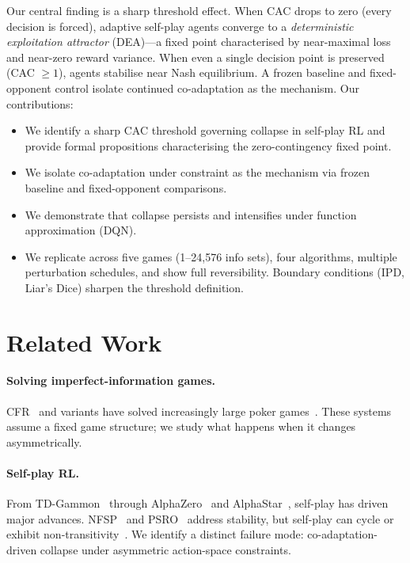 \documentclass[sigconf,anonymous]{acmart}
\begin{document}
Our central finding is a sharp threshold effect. When CAC drops to zero (every decision is forced), adaptive self-play agents converge to a \emph{deterministic exploitation attractor} (DEA)---a fixed point characterised by near-maximal loss and near-zero reward variance. When even a single decision point is preserved (CAC $\geq 1$), agents stabilise near Nash equilibrium. A frozen baseline and fixed-opponent control isolate continued co-adaptation as the mechanism. Our contributions:
\begin{itemize}
  \item We identify a sharp CAC threshold governing collapse in self-play RL and provide formal propositions characterising the zero-contingency fixed point.
  \item We isolate co-adaptation under constraint as the mechanism via frozen baseline and fixed-opponent comparisons.
  \item We demonstrate that collapse persists and intensifies under function approximation (DQN).
  \item We replicate across five games (1--24{,}576 info sets), four algorithms, multiple perturbation schedules, and show full reversibility. Boundary conditions (IPD, Liar's Dice) sharpen the threshold definition.
\end{itemize}

\section{Related Work}

\paragraph{Solving imperfect-information games.}
CFR~\cite{zinkevich2007regret} and variants have solved increasingly large poker games~\cite{bowling2015heads,moravcik2017deepstack,brown2018superhuman,brown2019superhuman}. These systems assume a fixed game structure; we study what happens when it changes asymmetrically.

\paragraph{Self-play RL.}
From TD-Gammon~\cite{tesauro1994td} through AlphaZero~\cite{silver2018general} and AlphaStar~\cite{vinyals2019grandmaster}, self-play has driven major advances. NFSP~\cite{heinrich2016deep} and PSRO~\cite{lanctot2017unified} address stability, but self-play can cycle or exhibit non-transitivity~\cite{balduzzi2019open,lanctot2019openspiel}. We identify a distinct failure mode: co-adaptation-driven collapse under asymmetric action-space constraints.
\end{document}
